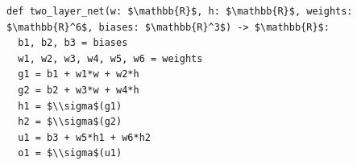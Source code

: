 \documentclass[border=10pt]{standalone}
\begin{document}
\begin{lstlisting}
def two_layer_net(w: $\mathbb{R}$, h: $\mathbb{R}$, weights: $\mathbb{R}^6$, biases: $\mathbb{R}^3$) -> $\mathbb{R}$:
  b1, b2, b3 = biases
  w1, w2, w3, w4, w5, w6 = weights
  g1 = b1 + w1*w + w2*h
  g2 = b2 + w3*w + w4*h
  h1 = $\\sigma$(g1)
  h2 = $\\sigma$(g2)
  u1 = b3 + w5*h1 + w6*h2
  o1 = $\\sigma$(u1)
\end{lstlisting}
\end{document}
